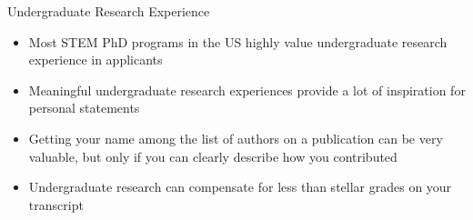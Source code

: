 \begin{frame}[fragile]{Undergraduate Research Experience}
    \begin{itemize}
        \item Most STEM PhD programs in the US highly value undergraduate research experience in applicants
        \item Meaningful undergraduate research experiences provide a lot of inspiration for personal statements
        \item Getting your name among the list of authors on a publication can be very valuable, but only if you can clearly describe how you contributed
        \item Undergraduate research can compensate for less than stellar grades on your transcript
    \end{itemize}
\end{frame}

